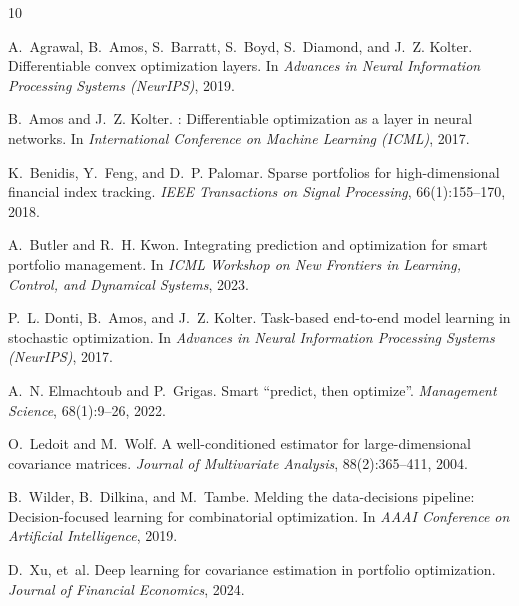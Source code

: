 \documentclass[11pt]{article}
\begin{document}
\begin{thebibliography}{10}

A.~Agrawal, B.~Amos, S.~Barratt, S.~Boyd, S.~Diamond, and J.~Z. Kolter.
\newblock Differentiable convex optimization layers.
\newblock In \emph{Advances in Neural Information Processing Systems (NeurIPS)}, 2019.

B.~Amos and J.~Z. Kolter.
: Differentiable optimization as a layer in neural networks.
\newblock In \emph{International Conference on Machine Learning (ICML)}, 2017.

K.~Benidis, Y.~Feng, and D.~P. Palomar.
\newblock Sparse portfolios for high-dimensional financial index tracking.
\newblock \emph{IEEE Transactions on Signal Processing}, 66(1):155--170, 2018.

A.~Butler and R.~H. Kwon.
\newblock Integrating prediction and optimization for smart portfolio management.
\newblock In \emph{ICML Workshop on New Frontiers in Learning, Control, and Dynamical Systems}, 2023.

P.~L. Donti, B.~Amos, and J.~Z. Kolter.
\newblock Task-based end-to-end model learning in stochastic optimization.
\newblock In \emph{Advances in Neural Information Processing Systems (NeurIPS)}, 2017.

A.~N. Elmachtoub and P.~Grigas.
\newblock Smart ``predict, then optimize''.
\newblock \emph{Management Science}, 68(1):9--26, 2022.

O.~Ledoit and M.~Wolf.
\newblock A well-conditioned estimator for large-dimensional covariance matrices.
\newblock \emph{Journal of Multivariate Analysis}, 88(2):365--411, 2004.

B.~Wilder, B.~Dilkina, and M.~Tambe.
\newblock Melding the data-decisions pipeline: Decision-focused learning for combinatorial optimization.
\newblock In \emph{AAAI Conference on Artificial Intelligence}, 2019.

D.~Xu, et~al.
\newblock Deep learning for covariance estimation in portfolio optimization.
\newblock \emph{Journal of Financial Economics}, 2024.

\end{thebibliography}
\end{document}
